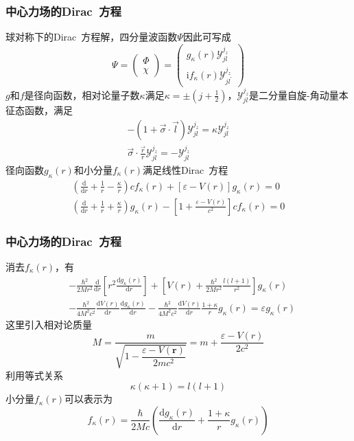 \documentclass[cjk,slidestop,compress,mathserif,blue]{beamer}
\begin{document}
\frame
{
	\frametitle{中心力场的\textrm{Dirac~}方程}
	球对称下的\textrm{Dirac~}方程解，四分量波函数$\Psi$因此可写成
	\begin{displaymath}
		\Psi=\left( 
		\begin{matrix}
			\Phi\\
			\chi
		\end{matrix}
		\right)=\left( 
		\begin{matrix}
			g_{\kappa}(r)\mathcal{Y}_{jl}^{j_z}\\
			\mathrm{i}f_{\kappa}(r)\mathcal{Y}_{jl^{\prime}}^{j_z}
		\end{matrix}
		\right)
	\end{displaymath}
	$g$和$f$是径向函数，相对论量子数$\kappa$满足$\kappa=\pm(j+\frac12)$，$\mathcal{Y}_{jl}^{j_z}$是二分量自旋-角动量本征态函数，满足
	\begin{displaymath}
		\begin{aligned}
			-(1+\vec{\sigma}\cdot\vec l)\mathcal{Y}_{jl}^{j_z}=\kappa\mathcal{Y}_{jl}^{j_z}\\
			\vec{\sigma}\cdot\frac{\vec r}r\mathcal{Y}_{jl}^{j_z}=-\mathcal{Y}_{jl}^{j_z}
		\end{aligned}
	\end{displaymath}
	径向函数$g_{\kappa}(r)$和小分量$f_{\kappa}(r)$满足线性\textrm{Dirac~}方程
	\begin{displaymath}
		\begin{aligned}
			\left( \frac{\mathrm{d}}{\mathrm{d}r}+\frac1r-\frac{\kappa}r \right)cf_{\kappa}(r)+[\varepsilon-V(r)]g_{\kappa}(r)=0\\
			\left( \frac{\mathrm{d}}{\mathrm{d}r}+\frac1r+\frac{\kappa}r \right)g_{\kappa}(r)-\left[ 1+\frac{\varepsilon-V(r)}{c^2} \right]cf_{\kappa}(r)=0
		\end{aligned}
	\end{displaymath}
}

\frame
{
	\frametitle{中心力场的\textrm{Dirac~}方程}
	消去$f_{\kappa}(r)$，有
	\begin{displaymath}
		\begin{aligned}
			&-\frac{\hbar^2}{2Mr^2}\frac{\mathrm{d}}{\mathrm{d}r}\left[ r^2\frac{\mathrm{d}g_{\kappa}(r)}{\mathrm{d}r} \right]+\left[ V(r)+\frac{\hbar^2}{2Mr^2}\frac{l(l+1)}{r^2} \right]g_{\kappa}(r)\\
			&-\frac{\hbar^2}{4M^2c^2}\frac{\mathrm{d}V(r)}{\mathrm{d}r}\frac{\mathrm{d}g_{\kappa}(r)}{\mathrm{d}r}-\frac{\hbar^2}{4M^2c^2}\frac{\mathrm{d}V(r)}{\mathrm{d}r}\frac{1+\kappa}rg_{\kappa}(r)=\varepsilon g_{\kappa}(r)
		\end{aligned}
	\end{displaymath}
	这里引入相对论质量$$M=\dfrac{m}{\sqrt{1-\dfrac{\varepsilon-V(\mathbf{r})}{2mc^2}}}=m+\frac{\varepsilon-V(r)}{2c^2}$$
	利用等式关系$$\kappa(\kappa+1)=l(l+1)$$
	小分量$f_{\kappa}(r)$可以表示为
	\begin{displaymath}
		f_{\kappa}(r)=\frac{\hbar}{2Mc}\left( \frac{\mathrm{d}g_{\kappa}(r)}{\mathrm{d}r}+\frac{1+\kappa}rg_{\kappa}(r) \right)
	\end{displaymath}
}
\end{document}
